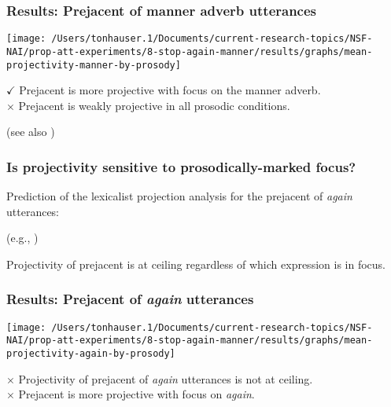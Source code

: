 \documentclass[pdf,xcolor=table,envcountsect,handout]{beamer}
\begin{document}
\begin{frame}
\frametitle{Results: Prejacent of manner adverb utterances}

\hfill \begin{footnotesize}  \end{footnotesize}
\hspace*{1cm} \texttt{[image: /Users/tonhauser.1/Documents/current-research-topics/NSF-NAI/prop-att-experiments/8-stop-again-manner/results/graphs/mean-projectivity-manner-by-prosody]}


\vspace*{.6cm}
\pause

{\bf $\checkmark$} Prejacent is more projective with focus on the manner adverb. 
\\[.1cm]
\pause
{\bf $\times$} Prejacent is weakly projective in all prosodic conditions. \\[-.2cm] \hfill \begin{tiny} (see also \citealt{stevens-etal2017}) \end{tiny}




\end{frame}

\begin{frame}
\frametitle{Is projectivity sensitive to prosodically-marked focus?}

Prediction of the lexicalist projection analysis for the prejacent of {\em again} utterances: \hfill \begin{tiny} (e.g., \citealt{beck2006,abrusan2013b}) \end{tiny}


Projectivity of prejacent is at ceiling regardless of which expression is in focus.

\end{frame}

\begin{frame}
\frametitle{Results: Prejacent of {\em again} utterances}

\hfill \begin{footnotesize}  \end{footnotesize}
\hspace*{1cm} \texttt{[image: /Users/tonhauser.1/Documents/current-research-topics/NSF-NAI/prop-att-experiments/8-stop-again-manner/results/graphs/mean-projectivity-again-by-prosody]}

\bigskip
\pause

{\bf $\times$} Projectivity of prejacent of {\em again} utterances is not at ceiling.
\\[.1cm]
{\bf $\times$} Prejacent is more projective with focus on {\em again}.

\end{frame}
\end{document}

